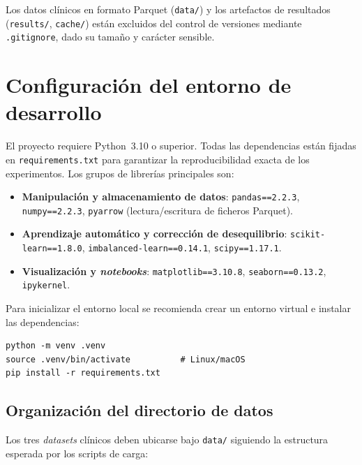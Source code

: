 Los datos clínicos en formato Parquet (\texttt{data/}) y los artefactos
de resultados (\texttt{results/}, \texttt{cache/}) están excluidos del
control de versiones mediante \texttt{.gitignore}, dado su tamaño y
carácter sensible.

\section{Configuración del entorno de desarrollo}
\label{sec:anexo_entorno}

El proyecto requiere Python~3.10 o superior. Todas las dependencias
están fijadas en \texttt{requirements.txt} para garantizar la
reproducibilidad exacta de los experimentos. Los grupos de librerías
principales son:

\begin{itemize}
    \item \textbf{Manipulación y almacenamiento de datos}:
    \texttt{pandas==2.2.3}, \texttt{numpy==2.2.3}, \texttt{pyarrow}
    (lectura/escritura de ficheros Parquet).

    \item \textbf{Aprendizaje automático y corrección de desequilibrio}:
    \texttt{scikit-learn==1.8.0}, \texttt{imbalanced-learn==0.14.1},
    \texttt{scipy==1.17.1}.

    \item \textbf{Visualización y \textit{notebooks}}:
    \texttt{matplotlib==3.10.8}, \texttt{seaborn==0.13.2},
    \texttt{ipykernel}.
\end{itemize}

Para inicializar el entorno local se recomienda crear un entorno virtual
e instalar las dependencias:

\begin{verbatim}
python -m venv .venv
source .venv/bin/activate          # Linux/macOS
pip install -r requirements.txt
\end{verbatim}

\subsection{Organización del directorio de datos}
\label{subsec:anexo_datos}

Los tres \textit{datasets} clínicos deben ubicarse bajo \texttt{data/}
siguiendo la estructura esperada por los scripts de carga:

